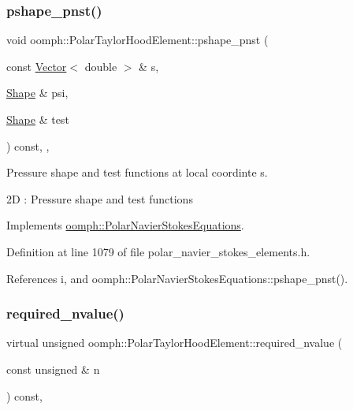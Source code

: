 \subsubsection{\texorpdfstring{pshape\+\_\+pnst()}{pshape\_pnst()}\hspace{0.1cm}{\footnotesize\ttfamily [2/2]}}
{\footnotesize\ttfamily void oomph\+::\+Polar\+Taylor\+Hood\+Element\+::pshape\+\_\+pnst (\begin{DoxyParamCaption}\item[{const \hyperlink{classoomph_1_1Vector}{Vector}$<$ double $>$ \&}]{s,  }\item[{\hyperlink{classoomph_1_1Shape}{Shape} \&}]{psi,  }\item[{\hyperlink{classoomph_1_1Shape}{Shape} \&}]{test }\end{DoxyParamCaption}) const\hspace{0.3cm}{\ttfamily [inline]}, {\ttfamily [protected]}, {\ttfamily [virtual]}}



Pressure shape and test functions at local coordinte s. 

2D \+: Pressure shape and test functions 

Implements \hyperlink{classoomph_1_1PolarNavierStokesEquations_a2ec5597d86a5f93615d4a29f0a01ebf7}{oomph\+::\+Polar\+Navier\+Stokes\+Equations}.



Definition at line 1079 of file polar\+\_\+navier\+\_\+stokes\+\_\+elements.\+h.



References i, and oomph\+::\+Polar\+Navier\+Stokes\+Equations\+::pshape\+\_\+pnst().

\mbox{\label{classoomph_1_1PolarTaylorHoodElement_a471a225bdcb0f6f1babd03f6e152da79}} 
\subsubsection{\texorpdfstring{required\+\_\+nvalue()}{required\_nvalue()}}
{\footnotesize\ttfamily virtual unsigned oomph\+::\+Polar\+Taylor\+Hood\+Element\+::required\+\_\+nvalue (\begin{DoxyParamCaption}\item[{const unsigned \&}]{n }\end{DoxyParamCaption}) const\hspace{0.3cm}{\ttfamily [inline]}, {\ttfamily [virtual]}}



